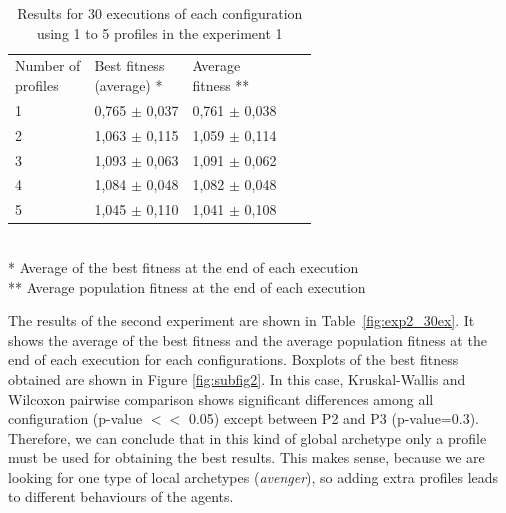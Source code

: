 \documentclass{sig-alternate}
\begin{document}
\begin{table}
\begin{center}
\caption{Results for 30 executions of each configuration using 1 to 5 profiles in the experiment 1}
\label{fig:exp1_30ex}

\begin{tabular}{lllll}
\hline\noalign{\smallskip}
\parbox[t]{2cm}{Number of\\ profiles}
& \parbox[t]{3cm}{Best fitness\\ (average) *}
& \parbox[t]{3cm}{Average\\ fitness **} \\
\noalign{\smallskip}
\hline
\noalign{\smallskip}
1 & 0,765 $\pm$ 0,037 & 0,761 $\pm$ 0,038 \\
2 & 1,063 $\pm$ 0,115 & 1,059 $\pm$ 0,114 \\
3 & 1,093 $\pm$ 0,063 & 1,091 $\pm$ 0,062 \\
4 & 1,084 $\pm$ 0,048 & 1,082 $\pm$ 0,048 \\
5 & 1,045 $\pm$ 0,110 & 1,041 $\pm$ 0,108 \\
\hline
\end{tabular}
\\
\** Average of the best fitness at the end of each execution\\
\*** Average population fitness  at the end of each execution \\
\end{center}
\end{table}



The results of the second experiment are shown in
Table~\ref{fig:exp2_30ex}. It shows the average of the best fitness
and the average population fitness at the end of each execution for
each configurations. Boxplots of the best fitness obtained are shown
in Figure \ref{fig:subfig2}. In this case, Kruskal-Wallis and Wilcoxon
pairwise comparison shows significant differences among all
configuration (p-value $<<$ 0.05) except between P2 and P3
(p-value=0.3). Therefore, we can conclude that in this kind of global
archetype only a profile must be used for obtaining the best
results. This makes sense, because we are looking for one type of
local archetypes ({\em avenger}), so adding extra profiles leads to
different behaviours of the agents. 
\end{document}
